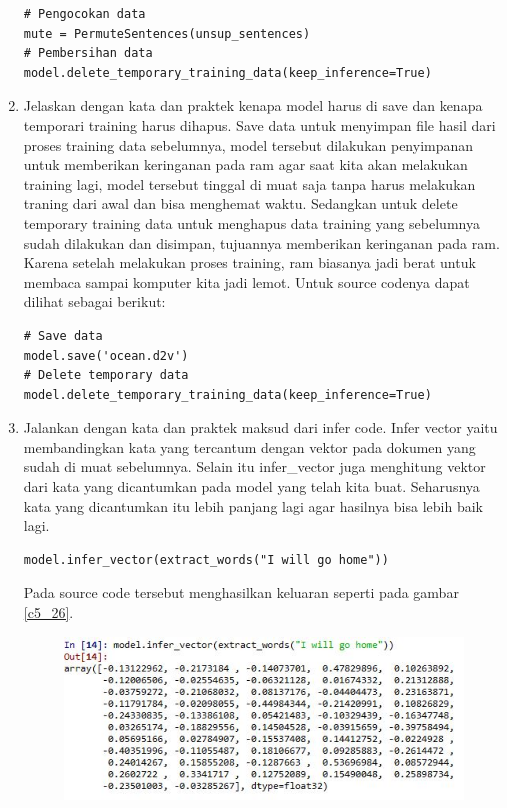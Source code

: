 \begin{enumerate}
\begin{verbatim}
# Pengocokan data
mute = PermuteSentences(unsup_sentences)
# Pembersihan data
model.delete_temporary_training_data(keep_inference=True)
\end{verbatim}
\item Jelaskan dengan kata dan praktek kenapa model harus di save dan kenapa temporari training harus dihapus.
\subitem Save data untuk menyimpan file hasil dari proses training data sebelumnya, model tersebut dilakukan penyimpanan untuk memberikan keringanan pada ram agar saat kita akan melakukan training lagi, model tersebut tinggal di muat saja tanpa harus melakukan traning dari awal dan bisa menghemat waktu. Sedangkan untuk delete temporary training data untuk menghapus data training yang sebelumnya sudah dilakukan dan disimpan, tujuannya memberikan keringanan pada ram. Karena setelah melakukan proses training, ram biasanya jadi berat untuk membaca sampai komputer kita jadi lemot. Untuk source codenya dapat dilihat sebagai berikut:
\begin{verbatim}
# Save data
model.save('ocean.d2v')
# Delete temporary data
model.delete_temporary_training_data(keep_inference=True)
\end{verbatim}
\item Jalankan dengan kata dan praktek maksud dari infer code.
\subitem Infer vector yaitu membandingkan kata yang tercantum dengan vektor pada dokumen yang sudah di muat sebelumnya. Selain itu infer\_vector juga menghitung vektor dari kata yang dicantumkan pada model yang telah kita buat. Seharusnya kata yang dicantumkan itu lebih panjang lagi agar hasilnya bisa lebih baik lagi.
\begin{verbatim}
model.infer_vector(extract_words("I will go home"))
\end{verbatim}
\subitem Pada source code tersebut menghasilkan keluaran seperti pada gambar \ref{c5_26}.
\begin{figure}[!htbp]
	\centerline{\includegraphics[width=1\textwidth]{figures/huda/chapter5/26.JPG}}

\end{figure}
\end{enumerate}

